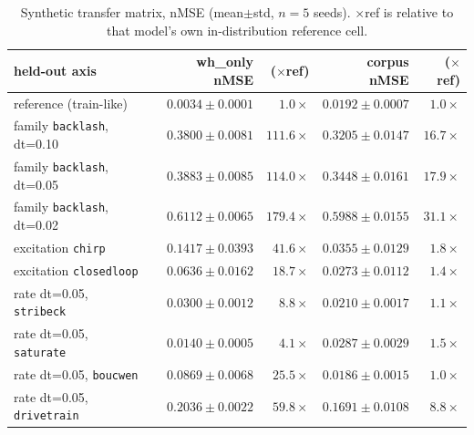 \documentclass{article}
\begin{document}
\begin{table}[h]
  \caption{Synthetic transfer matrix, nMSE (mean$\pm$std, $n=5$ seeds). $\times$ref is
  relative to that model's own in-distribution reference cell.}
  \label{tab:headline}
  \centering
  \small
  \begin{tabular}{lrrrr}
    \toprule
    held-out axis & wh\_only nMSE & ($\times$ref) & corpus nMSE & ($\times$ref) \\
    \midrule
    reference (train-like) & $0.0034\pm0.0001$ & $1.0\times$ & $0.0192\pm0.0007$ & $1.0\times$ \\
    family \texttt{backlash}, dt=0.10 & $0.3800\pm0.0081$ & $111.6\times$ & $\mathbf{0.3205\pm0.0147}$ & $\mathbf{16.7\times}$ \\
    family \texttt{backlash}, dt=0.05 & $0.3883\pm0.0085$ & $114.0\times$ & $\mathbf{0.3448\pm0.0161}$ & $\mathbf{17.9\times}$ \\
    family \texttt{backlash}, dt=0.02 & $0.6112\pm0.0065$ & $179.4\times$ & $\mathbf{0.5988\pm0.0155}$ & $\mathbf{31.1\times}$ \\
    excitation \texttt{chirp} & $0.1417\pm0.0393$ & $41.6\times$ & $\mathbf{0.0355\pm0.0129}$ & $\mathbf{1.8\times}$ \\
    excitation \texttt{closedloop} & $0.0636\pm0.0162$ & $18.7\times$ & $\mathbf{0.0273\pm0.0112}$ & $\mathbf{1.4\times}$ \\
    rate dt=0.05, \texttt{stribeck} & $0.0300\pm0.0012$ & $8.8\times$ & $\mathbf{0.0210\pm0.0017}$ & $\mathbf{1.1\times}$ \\
    rate dt=0.05, \texttt{saturate} & $\mathbf{0.0140\pm0.0005}$ & $\mathbf{4.1\times}$ & $0.0287\pm0.0029$ & $1.5\times$ \\
    rate dt=0.05, \texttt{boucwen} & $0.0869\pm0.0068$ & $25.5\times$ & $\mathbf{0.0186\pm0.0015}$ & $\mathbf{1.0\times}$ \\
    rate dt=0.05, \texttt{drivetrain} & $0.2036\pm0.0022$ & $59.8\times$ & $\mathbf{0.1691\pm0.0108}$ & $\mathbf{8.8\times}$ \\
    \bottomrule
  \end{tabular}
\end{table}
\end{document}
